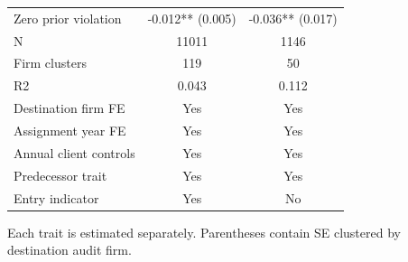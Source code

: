 \begin{table}[!htbp]
{\begin{tabular}{lcc}
Zero prior violation & -0.012** (0.005) & -0.036** (0.017) \\
N & 11011 & 1146 \\
Firm clusters & 119 & 50 \\
R2 & 0.043 & 0.112 \\
Destination firm FE & Yes & Yes \\
Assignment year FE & Yes & Yes \\
Annual client controls & Yes & Yes \\
Predecessor trait & Yes & Yes \\
Entry indicator & Yes & No \\
\bottomrule
\end{tabular}}
\begin{minipage}{\textwidth}\footnotesize Each trait is estimated separately. Parentheses contain SE clustered by destination audit firm.\end{minipage}
\end{table}
